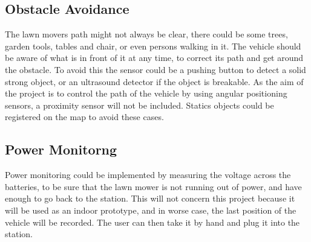 \subsection{Obstacle Avoidance}
The lawn movers path might not always be clear, there could be some trees, garden tools, tables and chair, or even persons walking in it. The vehicle should be aware of what is in front of it at any time, to correct its path and get around the obstacle. To avoid this the sensor could be a pushing button to detect a solid strong object, or an ultrasound detector if the object is breakable.
As the aim of the project is to control the path of the vehicle by using angular positioning sensors, a proximity sensor will not be included. Statics objects could be registered on the map to avoid these cases.

\subsection{Power Monitorng}
Power monitoring could be implemented by measuring the voltage across the batteries, to be sure that the lawn mower is not running out of power, and have enough to go back to the station. 
This will not concern this project because it will be used as an indoor prototype, and in worse case, the last position of the vehicle will be recorded. The user can then take it by hand and plug it into the station.